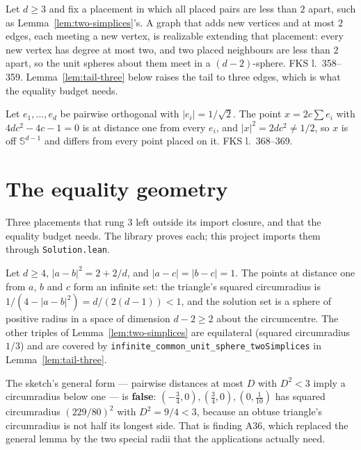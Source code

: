 \begin{lemma}
  \label{lem:tail}
  \leanok
  Let $d \ge 3$ and fix a placement in which all placed pairs are less than $2$ apart, such
  as Lemma~\ref{lem:two-simplices}'s. A graph that adds new vertices and at most $2$ edges,
  each meeting a new vertex, is realizable extending that placement: every new vertex has
  degree at most two, and two placed neighbours are less than $2$ apart, so the unit spheres
  about them meet in a $(d-2)$-sphere. FKS l.~358--359. Lemma~\ref{lem:tail-three} below
  raises the tail to three edges, which is what the equality budget needs.
\end{lemma}

\begin{lemma}
  \label{lem:basis-apex}
  \leanok
  Let $e_1, \dots, e_d$ be pairwise orthogonal with $\lvert e_i\rvert = 1/\sqrt 2$. The point
  $x = 2c \sum e_i$ with $4dc^2 - 4c - 1 = 0$ is at distance one from every $e_i$, and
  $\lvert x\rvert^2 = 2dc^2 \ne 1/2$, so $x$ is off $\mathbb{S}^{d-1}$ and differs from every
  point placed on it. FKS l.~368--369.
\end{lemma}

\section{The equality geometry}
\label{sec:equality-geometry}

Three placements that rung 3 left outside its import closure, and that the equality budget
needs. The library proves each; this project imports them through \texttt{Solution.lean}.

\begin{lemma}
  \label{lem:two-apices}
  \leanok
  Let $d \ge 4$, $\lvert a - b\rvert^2 = 2 + 2/d$, and $\lvert a - c\rvert = \lvert b - c\rvert = 1$.
  The points at distance one from $a$, $b$ and $c$ form an infinite set: the triangle's
  squared circumradius is $1/(4 - \lvert a-b\rvert^2) = d/(2(d-1)) < 1$, and the solution set
  is a sphere of positive radius in a space of dimension $d - 2 \ge 2$ about the
  circumcentre. The other triples of Lemma~\ref{lem:two-simplices} are equilateral
  (squared circumradius $1/3$) and are covered by
  \texttt{infinite\_common\_unit\_sphere\_twoSimplices} in Lemma~\ref{lem:tail-three}.

  The sketch's general form --- pairwise distances at most $D$ with $D^2 < 3$ imply a
  circumradius below one --- is \textbf{false}: $(-\tfrac34, 0), (\tfrac34, 0),
  (0, \tfrac1{10})$ has squared circumradius $(229/80)^2$ with $D^2 = 9/4 < 3$, because an
  obtuse triangle's circumradius is not half its longest side. That is finding A36, which
  replaced the general lemma by the two special radii that the applications actually need.
\end{lemma}


